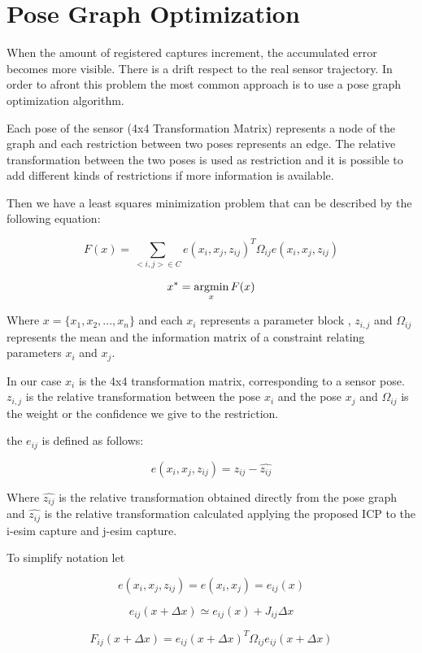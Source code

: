 \section{Pose Graph Optimization}

When the amount of registered captures increment, the accumulated error 
becomes more visible. There is a drift respect to the real sensor trajectory. 
In order to afront this problem the most common approach is to use a pose graph 
optimization algorithm. 

Each pose of the sensor (4x4 Transformation Matrix) represents a node of the 
graph and each restriction between two poses represents an edge. The relative 
transformation between the two poses is used as restriction and it is possible 
to add different kinds of restrictions if more information is available.

Then we have a least squares minimization problem that can be described by the following equation:

$$ F(x) = \sum\limits_{<i,j> \in C } e(x_i,x_j,z_{ij})^T \Omega_{ij} e(x_i,x_j,z_{ij}) $$

$$ x^* = \mathop{\rm argmin}_x F(x) $$

Where $x=\{x_1,x_2,...,x_n\}$ and each $x_i$ represents a parameter block , $z_{i,j}$ and $\Omega_{ij}$ represents the mean  
 and the information matrix  of a constraint 
relating parameters $x_i$ and $x_j$.

In our case $x_i$ is the 4x4 transformation matrix, corresponding to a sensor pose. $z_{i,j}$ is the 
relative transformation between the pose $x_i$ and the pose $x_j$ and $\Omega_{ij}$ is the weight or 
the confidence we give to the restriction.

the $e_{ij}$ is defined as follows:

$$
e(x_i,x_j,z_{ij}) = z_{ij} - \hat{z_{ij}}
$$

Where $\hat{z_{ij}}$ is the relative transformation obtained directly from the pose graph and $\hat{z_{ij}}$ 
is the relative transformation calculated applying the proposed ICP to the i-esim capture and j-esim capture.


To simplify notation let 

$$
e(x_i,x_j,z_{ij}) = e(x_i,x_j) = e_{ij}(x)
$$

\begin{equation}
\label{eq:errorAprox}
e_{ij}(x + \Delta x) \simeq e_{ij}(x) + J_{ij} \Delta x
\end{equation}


\begin{equation}
\label{eq:globalFunc}
F_{ij}(x + \Delta x) = e_{ij}(x + \Delta x)^T \Omega_{ij}  e_{ij}(x + \Delta x)
\end{equation}

